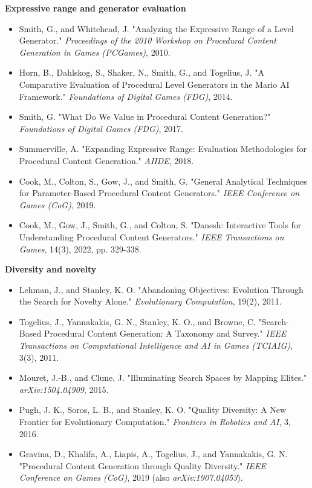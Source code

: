 \documentclass[
  10pt,
  twocolumn]{article}
\providecommand{\tightlist}{%
  \setlength{\itemsep}{0pt}\setlength{\parskip}{0pt}}
\begin{document}
\textbf{Expressive range and generator evaluation}

\begin{itemize}
\tightlist
\item
  Smith, G., and Whitehead, J. "Analyzing the Expressive Range of a
  Level Generator." \emph{Proceedings of the 2010 Workshop on Procedural
  Content Generation in Games (PCGames)}, 2010.
\item
  Horn, B., Dahlskog, S., Shaker, N., Smith, G., and Togelius, J. "A
  Comparative Evaluation of Procedural Level Generators in the Mario AI
  Framework." \emph{Foundations of Digital Games (FDG)}, 2014.
\item
  Smith, G. "What Do We Value in Procedural Content Generation?"
  \emph{Foundations of Digital Games (FDG)}, 2017.
\item
  Summerville, A. "Expanding Expressive Range: Evaluation Methodologies
  for Procedural Content Generation." \emph{AIIDE}, 2018.
\item
  Cook, M., Colton, S., Gow, J., and Smith, G. "General Analytical
  Techniques for Parameter-Based Procedural Content Generators."
  \emph{IEEE Conference on Games (CoG)}, 2019.
\item
  Cook, M., Gow, J., Smith, G., and Colton, S. "Danesh: Interactive
  Tools for Understanding Procedural Content Generators." \emph{IEEE
  Transactions on Games}, 14(3), 2022, pp. 329-338.
\end{itemize}

\textbf{Diversity and novelty}

\begin{itemize}
\tightlist
\item
  Lehman, J., and Stanley, K. O. "Abandoning Objectives: Evolution
  Through the Search for Novelty Alone." \emph{Evolutionary
  Computation}, 19(2), 2011.
\item
  Togelius, J., Yannakakis, G. N., Stanley, K. O., and Browne, C.
  "Search-Based Procedural Content Generation: A Taxonomy and Survey."
  \emph{IEEE Transactions on Computational Intelligence and AI in Games
  (TCIAIG)}, 3(3), 2011.
\item
  Mouret, J.-B., and Clune, J. "Illuminating Search Spaces by Mapping
  Elites." \emph{arXiv:1504.04909}, 2015.
\item
  Pugh, J. K., Soros, L. B., and Stanley, K. O. "Quality Diversity: A
  New Frontier for Evolutionary Computation." \emph{Frontiers in
  Robotics and AI}, 3, 2016.
\item
  Gravina, D., Khalifa, A., Liapis, A., Togelius, J., and Yannakakis, G.
  N. "Procedural Content Generation through Quality Diversity."
  \emph{IEEE Conference on Games (CoG)}, 2019 (also
  \emph{arXiv:1907.04053}).
\end{itemize}
\end{document}
